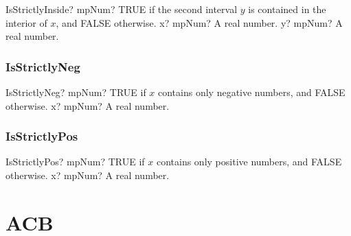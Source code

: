 \begin{mpFunctionsExtract}
	\mpFunctionTwo
	{IsStrictlyInside? mpNum? TRUE  if the second interval $y$ is contained in the interior of $x$, and FALSE otherwise.}
	{x? mpNum? A real number.}
	{y? mpNum? A real number.}
\end{mpFunctionsExtract}




\subsection{IsStrictlyNeg}

\begin{mpFunctionsExtract}
	\mpFunctionOne
	{IsStrictlyNeg? mpNum? TRUE if $x$ contains only negative numbers, and FALSE otherwise.}
	{x? mpNum? A real number.}
\end{mpFunctionsExtract}




\subsection{IsStrictlyPos}

\begin{mpFunctionsExtract}
	\mpFunctionOne
	{IsStrictlyPos? mpNum? TRUE if $x$ contains only positive numbers, and FALSE otherwise.}
	{x? mpNum? A real number.}
\end{mpFunctionsExtract}








\chapter{ACB}
\lipsum[1]
